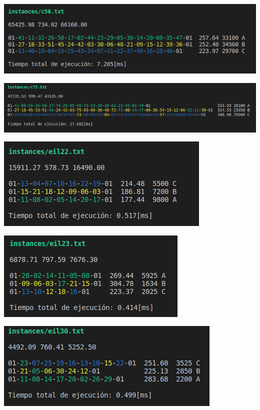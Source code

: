 \begin{center}
    \includegraphics[width=\columnwidth]{imagenes/c50}
\end{center}
\begin{center}
    \includegraphics[width=\columnwidth]{imagenes/c75}
\end{center}
\begin{center}
    \includegraphics[width=\columnwidth]{imagenes/eil22}
\end{center}
\begin{center}
    \includegraphics[width=\columnwidth]{imagenes/eil23}
\end{center}
\begin{center}
    \includegraphics[width=\columnwidth]{imagenes/eil30}
\end{center}
